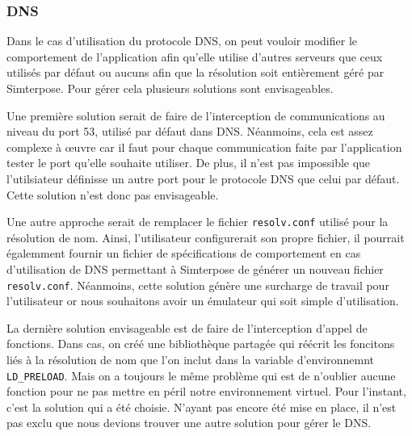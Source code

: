 \subsubsection{DNS}

Dans le cas d'utilisation du protocole DNS, on peut vouloir modifier le
comportement de l'application afin qu'elle utilise d'autres serveurs que ceux
utilisés par défaut ou aucuns afin que la résolution soit entièrement géré par
Simterpose. Pour gérer cela plusieurs solutions sont envisageables.

Une première solution serait de faire de l'interception de communications au
niveau du port 53, utilisé par défaut dans DNS. Néanmoins, cela est assez
complexe à \oe uvre car il faut pour chaque communication faite par
l'application tester le port qu'elle souhaite utiliser. De plus, il n'est pas
impossible que l'utilsiateur définisse un autre port pour le protocole DNS que
celui par défaut. Cette solution n'est donc pas envisageable.

Une autre approche serait de remplacer le fichier \texttt{resolv.conf} utilisé
pour la résolution de nom. Ainsi, l'utilisateur configurerait son propre
fichier, il pourrait égalemment fournir un fichier de spécifications de
comportement en cas d'utilisation de DNS permettant à Simterpose de générer un
nouveau fichier \texttt{resolv.conf}. Néanmoins, cette solution génère une
surcharge de travail pour l'utilisateur or nous souhaitons avoir un émulateur
qui soit simple d'utilisation.

La dernière solution envisageable est de faire de l'interception d'appel de
fonctions. Dans cas, on créé une bibliothèque partagée qui réécrit les foncitons
liés à la résolution de nom que l'on inclut dans la variable d'environnemnt
\texttt{LD\_PRELOAD}. Mais on a toujours le même problème qui est de n'oublier
aucune fonction pour ne pas mettre en péril notre environnement virtuel. Pour
l'instant, c'est la solution qui a été choisie. N'ayant pas encore été mise en
place, il n'est pas exclu que nous devions trouver une autre solution pour gérer
le DNS.
